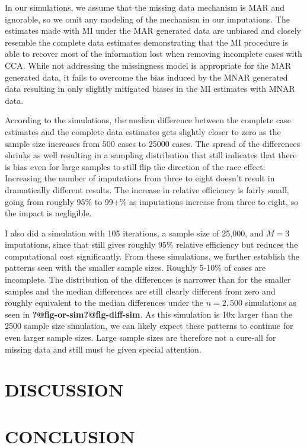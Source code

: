 \documentclass[
  letterpaper,
  DIV=11,
  numbers=noendperiod]{scrartcl}
\begin{document}
In our simulations, we assume that the missing data mechanism is MAR and
ignorable, so we omit any modeling of the mechanism in our imputations.
The estimates made with MI under the MAR generated data are unbiased and
closely resemble the complete data estimates demonstrating that the MI
procedure is able to recover most of the information lost when removing
incomplete cases with CCA. While not addressing the missingness model is
appropriate for the MAR generated data, it fails to overcome the bias
induced by the MNAR generated data resulting in only slightly mitigated
biases in the MI estimates with MNAR data.

According to the simulations, the median difference between the complete
case estimates and the complete data estimates gets slightly closer to
zero as the sample size increases from 500 cases to 25000 cases. The
spread of the differences shrinks as well resulting in a sampling
distribution that still indicates that there is bias even for large
samples to still flip the direction of the race effect. Increasing the
number of imputations from three to eight doesn't result in dramatically
different results. The increase in relative efficiency is fairly small,
going from roughly 95\% to 99+\% as imputations increase from three to
eight, so the impact is negligible.

I also did a simulation with 105 iterations, a sample size of 25,000,
and \(M = 3\) imputations, since that still gives roughly 95\% relative
efficiency but reduces the computational cost significantly. From these
simulations, we further establish the patterns seen with the smaller
sample sizes. Roughly 5-10\% of cases are incomplete. The distribution
of the differences is narrower than for the smaller samples and the
median differences are still clearly different from zero and roughly
equivalent to the median differences under the \(n = 2,500\) simulations
as seen in \textbf{?@fig-or-sim}\textbf{?@fig-diff-sim}. As this
simulation is 10x larger than the 2500 sample size simulation, we can
likely expect these patterns to continue for even larger sample sizes.
Large sample sizes are therefore not a cure-all for missing data and
still must be given special attention.

\hypertarget{sec-discussion}{%
\section{DISCUSSION}\label{sec-discussion}}

\hypertarget{sec-conclusion}{%
\section{CONCLUSION}\label{sec-conclusion}}
\end{document}
